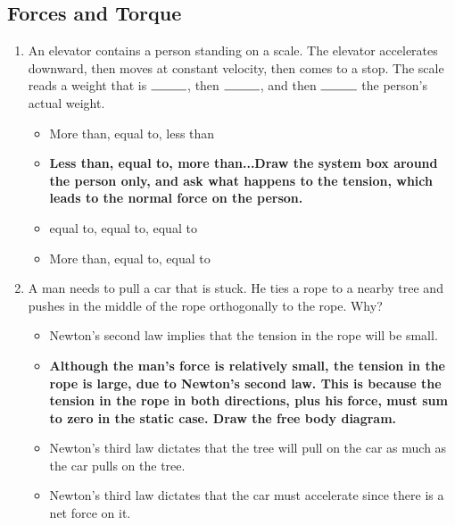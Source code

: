 \documentclass[10pt]{article}
\begin{document}
\subsection{Forces and Torque}
\begin{enumerate}
\item An elevator contains a person standing on a scale.  The elevator accelerates downward, then moves at constant velocity, then comes to a stop.  The scale reads a weight that is $\rule{1cm}{0.15mm}$, then $\rule{1cm}{0.15mm}$, and then $\rule{1cm}{0.15mm}$ the person's actual weight.
\begin{itemize}
\item More than, equal to, less than
\item \textbf{Less than, equal to, more than...Draw the system box around the person only, and ask what happens to the tension, which leads to the normal force on the person.}
\item equal to, equal to, equal to
\item More than, equal to, equal to
\end{itemize}
\item A man needs to pull a car that is stuck.  He ties a rope to a nearby tree and pushes in the middle of the rope orthogonally to the rope.  Why?
\begin{itemize}
\item Newton's second law implies that the tension in the rope will be small.
\item \textbf{Although the man's force is relatively small, the tension in the rope is large, due to Newton's second law. This is because the tension in the rope in both directions, plus his force, must sum to zero in the static case.  Draw the free body diagram.}
\item Newton's third law dictates that the tree will pull on the car as much as the car pulls on the tree.
\item Newton's third law dictates that the car must accelerate since there is a net force on it.
\end{itemize}
\end{enumerate}
\end{document}

